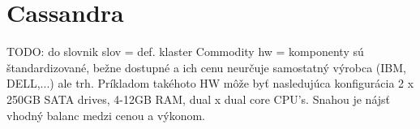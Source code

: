 \documentclass[11pt,twoside,a4paper]{book}
\begin{document}
\section{Cassandra}

% 



% 
% 

TODO: do slovnik slov = def. klaster
Commodity hw = komponenty sú štandardizované, bežne dostupné a ich cenu neurčuje samostatný výrobca (IBM, DELL,...) ale trh. Príkladom takéhoto HW môže byť nasledujúca konfigurácia 2 x 250GB SATA drives, 4-12GB RAM, dual x dual core CPU's. Snahou je nájsť vhodný balanc medzi cenou a výkonom.
\end{document}
